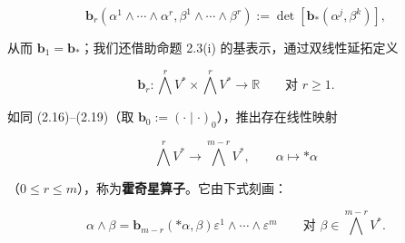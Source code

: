\begin{remark}
\[
\mathbf{b}_r(\alpha^1 \wedge \cdots \wedge \alpha^r, \beta^1 \wedge \cdots \wedge \beta^r) := \det[\mathbf{b}_*(\alpha^j, \beta^k)] ,
\]

从而 $ \mathbf{b}_1 = \mathbf{b}_* $；我们还借助命题 2.3(i) 的基表示，通过双线性延拓定义

\[
\mathbf{b}_r: \bigwedge^r V^* \times \bigwedge^r V^* \to \mathbb{R} \qquad \text{对 } r \ge 1 .
\]

如同 (2.16)–(2.19)（取 $ \mathbf{b}_0 := (\cdot \mid \cdot)_0 $），推出存在线性映射

\[
\bigwedge^r V^* \to \bigwedge^{m-r} V^*, \qquad \alpha \mapsto \ast\alpha
\]

（$ 0 \le r \le m $），称为\textbf{霍奇星算子}。它由下式刻画：

\begin{equation}
\alpha \wedge \beta = \mathbf{b}_{m-r}(\ast\alpha, \beta)\varepsilon^1 \wedge \cdots \wedge \varepsilon^m \qquad \text{对 } \beta \in \bigwedge^{m-r} V^* .\tag{2.25}
\end{equation}
\end{remark}

